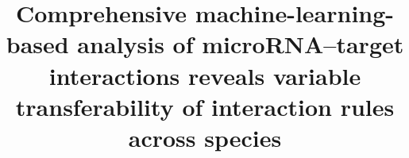 \documentclass{bmcart}
\begin{document}
\begin{frontmatter}

\begin{fmbox}



\title{Comprehensive machine-learning-based analysis of microRNA--target interactions reveals variable transferability of interaction rules across species}



\author[
   addressref={aff1},                   %
   email={benorgi@post.bgu.ac.il}       %
]{ }
   
\author[
  addressref={aff1},                   %
  corref={aff1},                       %
  email={vaksler@post.bgu.ac.il}
]{ }



\address[id=aff1]{%
  , 
  ,                              %
}



\end{fmbox}
\end{frontmatter}
\end{document}
